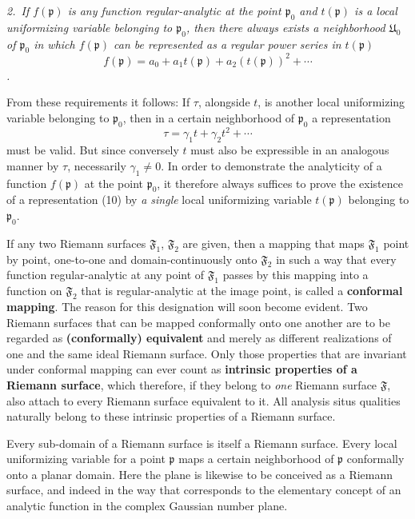 \documentclass{article}
\begin{document}
\emph{2.~If $f(\mathfrak{p})$ is any function regular-analytic at the point $\mathfrak{p}_0$ and $t(\mathfrak{p})$ is a local uniformizing variable belonging to $\mathfrak{p}_0$, then there always exists a neighborhood $\mathfrak{U}_0$ of $\mathfrak{p}_0$ in which $f(\mathfrak{p})$ can be represented as a regular power series in $t(\mathfrak{p})$}
\[ f(\mathfrak{p}) = a_0 + a_1 t(\mathfrak{p}) + a_2 (t(\mathfrak{p}))^2 + \cdots \tag{10} \]
\emph{.}

From these requirements it follows: If $\tau$, alongside $t$, is another local uniformizing variable belonging to $\mathfrak{p}_0$, then in a certain neighborhood of $\mathfrak{p}_0$ a representation
\[ \tau = \gamma_1 t + \gamma_2 t^2 + \cdots \]
must be valid. But since conversely $t$ must also be expressible in an analogous manner by $\tau$, necessarily $\gamma_1 \neq 0$. In order to demonstrate the analyticity of a function $f(\mathfrak{p})$ at the point $\mathfrak{p}_0$, it therefore always suffices to prove the existence of a representation (10) by \emph{a single} local uniformizing variable $t(\mathfrak{p})$ belonging to $\mathfrak{p}_0$.

If any two Riemann surfaces $\mathfrak{F}_1$, $\mathfrak{F}_2$ are given, then a mapping that maps $\mathfrak{F}_1$ point by point, one-to-one and domain-continuously onto $\mathfrak{F}_2$ in such a way that every function regular-analytic at any point of $\mathfrak{F}_1$ passes by this mapping into a function on $\mathfrak{F}_2$ that is regular-analytic at the image point, is called a \textbf{conformal mapping}. The reason for this designation will soon become evident. Two Riemann surfaces that can be mapped conformally onto one another are to be regarded as \textbf{(conformally) equivalent} and merely as different realizations of one and the same ideal Riemann surface. Only those properties that are invariant under conformal mapping can ever count as \textbf{intrinsic properties of a Riemann surface}, which therefore, if they belong to \emph{one} Riemann surface $\mathfrak{F}$, also attach to every Riemann surface equivalent to it. All analysis situs qualities naturally belong to these intrinsic properties of a Riemann surface.

Every sub-domain of a Riemann surface is itself a Riemann surface. Every local uniformizing variable for a point $\mathfrak{p}$ maps a certain neighborhood of $\mathfrak{p}$ conformally onto a planar domain. Here the plane is likewise to be conceived as a Riemann surface, and indeed in the way that corresponds to the elementary concept of an analytic function in the complex Gaussian number plane.
\end{document}
